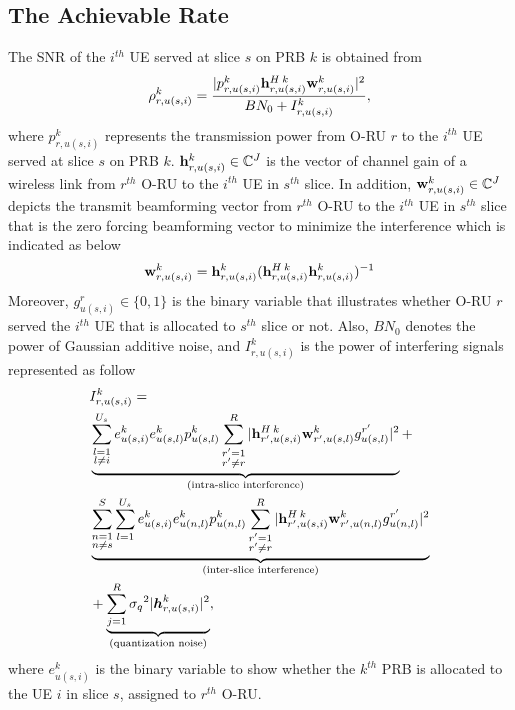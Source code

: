 \documentclass[conference]{IEEEtran}
\begin{document}
\subsection{The Achievable Rate}
The SNR of the $i^{th}$ UE served at slice $s$ on PRB $k$ is obtained from
\begin{equation}\label{eq1}
\rho_{r,u(s,i)}^{k} =  \frac{|p_{r,u(s,i)}^{k}{\bold{h}_{r,u(s,i)}^{H \: k}} \bold{w}_{r,u(s,i)}^{k}|^2}{BN_0 + I_{r,u(s,i)}^{k}},
\end{equation} 
where $p_{r,u(s,i)}^{k}$ represents the transmission power from O-RU $r$ to the $i^{th}$ UE served at slice $s$ on PRB $k$. 
${\bold{h}_{r,u(s,i)}^{k}} \in \mathbb{C}^{J}$ is the vector of channel gain of a wireless link from 
$r^{th}$ O-RU to the $i^{th}$ UE in $s^{th}$ slice. In addition, $\bold{w}_{r,u(s,i)}^{k} \in \mathbb{C}^{J}$ depicts the  transmit beamforming vector from $r^{th}$ O-RU to the $i^{th}$ UE in $s^{th}$ slice that is the zero forcing beamforming vector to minimize the interference which is indicated as below
\begin{equation}
\bold{w}_{r,u(s,i)}^{k} = {\bold{h}_{r,u(s,i)}^{k}}({\bold{h}_{r,u(s,i)}^{H \: k}} {\bold{h}_{r,u(s,i)}^{k}})^{-1}
\end{equation}
Moreover, $g_{u(s,i)}^r \in \{0,1\}$ is the binary variable that illustrates whether O-RU $r$ served the $i^{th}$ UE that is allocated to $s^{th}$ slice or not. 
Also, $BN_0$ denotes the power of Gaussian additive noise, and $I_{r,u(s,i)}^{k}$ is the power of interfering signals represented as follow
\begin{equation}\label{eqI}
\begin{split}
&I_{r,u(s,i)}^{k} =\\
 &\underbrace{\sum_{\substack{l=1 \\ l\neq i}}^{{U}_{s}} e^{k}_{u(s,i)}e^{k}_{u(s,l)}  p_{u(s,l)}^{k}\sum_{\substack{r'=1 \\ r'\neq r}}^{R}|{\bold{h}_{r',u(s,i)}^{H \: k}} \bold{w}_{r',u(s,l)}^{k} g_{u(s,l)}^{r'}|^2}_{\text{(intra-slice interference)}}+\\
&\underbrace{\sum_{\substack{n = 1 \\ n\neq s}}^{S}\sum_{l=1}^{{U}_s} e^{k}_{u(s,i)}e^{k}_{u(n,l)}  p_{u(n,l)}^{k}\sum_{\substack{r'=1 \\ r'\neq r}}^{R}|{\bold{h}_{r',u(s,i)}^{H \: k}} \bold{w}_{r',u(n,l)}^{k} g_{u(n,l)}^{r'}|^2}_{\text{(inter-slice interference)}}\\
&+\underbrace{  \sum_{j=1}^{{R}} {\sigma_q}^2 |\boldsymbol{h}_{r,{u(s,i)}}^k|^2 }_{\text{(quantization noise)}},
\end{split}
\end{equation}
where $e^{k}_{u(s,i)}$ is the binary variable to show whether the $k^{th}$ PRB is allocated to the UE $i$ in slice $s$, assigned to $r^{th}$ O-RU. %
\end{document}
